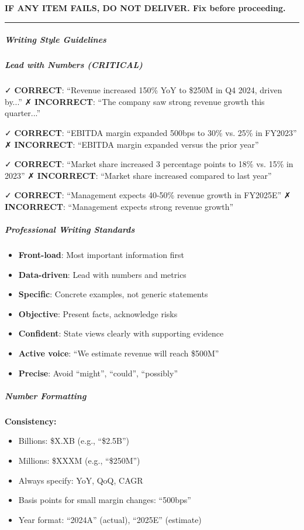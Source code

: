 \documentclass[11pt]{article}
\begin{document}
\textbf{IF ANY ITEM FAILS, DO NOT DELIVER. Fix before proceeding.}


\vspace{0.5em}\hrule\vspace{0.5em}

\subparagraph{Writing Style Guidelines}\mbox{}\par

\subparagraph{Lead with Numbers (CRITICAL)}\mbox{}\par

✓ \textbf{CORRECT}: ``Revenue increased 150\% YoY to \$250M in Q4 2024, driven by...'' ✗ \textbf{INCORRECT}: ``The company saw strong revenue growth this quarter...''


✓ \textbf{CORRECT}: ``EBITDA margin expanded 500bps to 30\% vs. 25\% in FY2023'' ✗ \textbf{INCORRECT}: ``EBITDA margin expanded versus the prior year''


✓ \textbf{CORRECT}: ``Market share increased 3 percentage points to 18\% vs. 15\% in 2023'' ✗ \textbf{INCORRECT}: ``Market share increased compared to last year''


✓ \textbf{CORRECT}: ``Management expects 40-50\% revenue growth in FY2025E'' ✗ \textbf{INCORRECT}: ``Management expects strong revenue growth''


\subparagraph{Professional Writing Standards}\mbox{}\par

\begin{itemize}[leftmargin=*,itemsep=2pt,topsep=2pt]
\item {} \textbf{Front-load}: Most important information first
\item {} \textbf{Data-driven}: Lead with numbers and metrics
\item {} \textbf{Specific}: Concrete examples, not generic statements
\item {} \textbf{Objective}: Present facts, acknowledge risks
\item {} \textbf{Confident}: State views clearly with supporting evidence
\item {} \textbf{Active voice}: ``We estimate revenue will reach \$500M''
\item {} \textbf{Precise}: Avoid ``might'', ``could'', ``possibly''
\end{itemize}

\subparagraph{Number Formatting}\mbox{}\par

\textbf{Consistency:}

\begin{itemize}[leftmargin=*,itemsep=2pt,topsep=2pt]
\item {} Billions: \$X.XB (e.g., ``\$2.5B'')
\item {} Millions: \$XXXM (e.g., ``\$250M'')
\item {} Always specify: YoY, QoQ, CAGR
\item {} Basis points for small margin changes: ``500bps''
\item {} Year format: ``2024A'' (actual), ``2025E'' (estimate)
\end{itemize}
\end{document}
